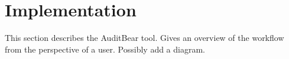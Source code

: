 \section{Implementation}
This section describes the AuditBear tool.  Gives an overview of the workflow from the perspective of a user.  Possibly add a diagram.

